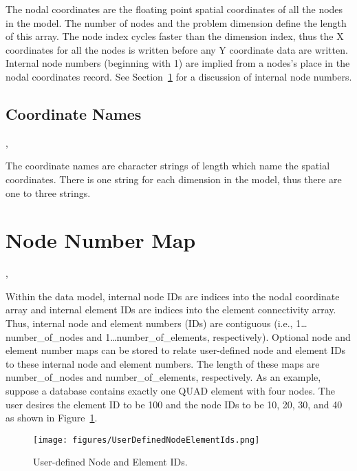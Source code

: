 The nodal coordinates are the floating point spatial coordinates of
all the nodes in the model. The number of nodes and the problem
dimension define the length of this array. The node index cycles
faster than the dimension index, thus the X coordinates for all the
nodes is written before any Y coordinate data are written. Internal
node numbers (beginning with 1) are implied from a nodes's place in
the nodal coordinates record. See Section~\ref{s:nnm} for a discussion
of internal node numbers.

\subsection{Coordinate Names}

\begin{spacing}{1.5}
\api {}, 
\end{spacing}

The coordinate names are character strings of length
 which name the spatial coordinates. There is
one string for each dimension in the model, thus there are one to
three strings.


\section{Node Number Map}\label{s:nnm}

\begin{spacing}{1.5}
\api {}, 


\end{spacing}

Within the data model, internal node IDs are indices into
the nodal coordinate array and internal element IDs are indices
into the element connectivity array. Thus, internal node and
element numbers (IDs) are contiguous (i.e., 1\ldots{number_of_nodes}
and 1\ldots{number_of_elements}, respectively). Optional
node and element number maps can be stored to relate user-defined
node and element IDs to these internal node and element numbers.
The length of these maps are {number_of_nodes} and {number_of_elements},
respectively. As an example, suppose a database contains exactly
one QUAD element with four nodes. The user desires the element
ID to be 100 and the node IDs to be 10, 20, 30, and 40 as shown
in  Figure~\ref{f:UserDefinedNodeElementIds}.
\begin{figure}[htbp]
\begin{center}
\texttt{[image: figures/UserDefinedNodeElementIds.png]}
\caption{User-defined Node and Element IDs.}\label{f:UserDefinedNodeElementIds}
\end{center}
\end{figure}

